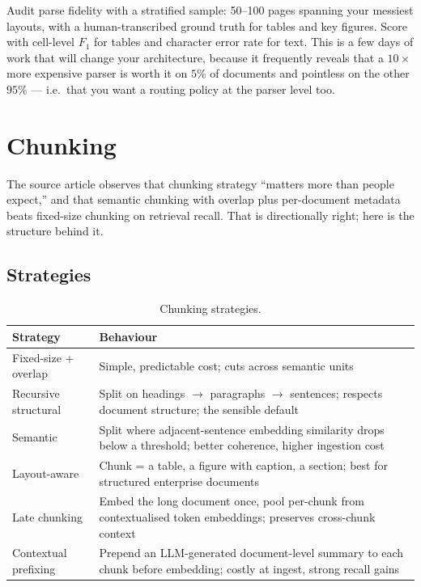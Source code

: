 \documentclass[11pt,twoside,openright]{book}
\theoremstyle{definition}
\theoremstyle{plain}
\theoremstyle{remark}
\begin{document}
\begin{practice}
Audit parse fidelity with a stratified sample: 50--100 pages spanning your
messiest layouts, with a human-transcribed ground truth for tables and key
figures. Score with cell-level $F_1$ for tables and character error rate for
text. This is a few days of work that will change your architecture, because it
frequently reveals that a $10\times$ more expensive parser is worth it on $5\%$
of documents and pointless on the other $95\%$ --- i.e.\ that you want a routing
policy at the parser level too.
\end{practice}

\section{Chunking}

The source article observes that chunking strategy ``matters more than people
expect,'' and that semantic chunking with overlap plus per-document metadata
beats fixed-size chunking on retrieval recall. That is directionally right; here
is the structure behind it.

\subsection{Strategies}

\begin{table}[H]
\centering\small
\renewcommand{\arraystretch}{1.3}
\begin{tabularx}{\textwidth}{@{}p{3.4cm} X@{}}
\toprule
\textbf{Strategy} & \textbf{Behaviour} \\
\midrule
Fixed-size + overlap & Simple, predictable cost; cuts across semantic units \\
Recursive structural & Split on headings $\rightarrow$ paragraphs $\rightarrow$ sentences; respects document structure; the sensible default \\
Semantic & Split where adjacent-sentence embedding similarity drops below a threshold; better coherence, higher ingestion cost \\
Layout-aware & Chunk = a table, a figure with caption, a section; best for structured enterprise documents \\
Late chunking & Embed the long document once, pool per-chunk from contextualised token embeddings; preserves cross-chunk context \\
Contextual prefixing & Prepend an LLM-generated document-level summary to each chunk before embedding; costly at ingest, strong recall gains \\
\bottomrule
\end{tabularx}
\caption{Chunking strategies.}
\end{table}
\end{document}
